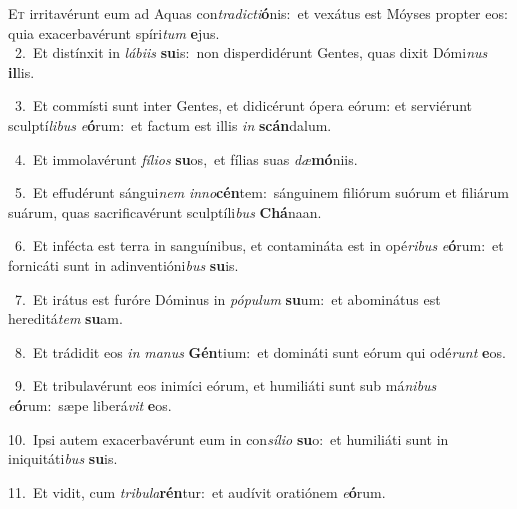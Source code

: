 \lettrine{\initial\textcolor{\initialcolor}{E}}{t} irritavérunt eum ad Aquas con\-\textit{tra}\-\textit{dic}\textit{ti}\textbf{ó}nis:~\star et vexátus est Móyses propter eos: quia exacerbavérunt spíri\textit{tum} \textbf{e}\-jus.\\
{\numbfont\textcolor{\numbcolor}{~2.}}~Et distínxit in \textit{lá}\-\textit{bi}\textit{is} \textbf{su}\-is:~\star non disperdidérunt Gentes, quas dixit Dómi\textit{nus} \textbf{il}\-lis.\par
{\numbfont\textcolor{\numbcolor}{~3.}}~Et commísti sunt inter Gentes, et didicérunt ópera eórum: et serviérunt sculptí\-\textit{li}\-\textit{bus} \textit{e}\-\textbf{ó}rum:~\star et factum est illis \textit{in} \textbf{scán}\-dalum.\par
{\numbfont\textcolor{\numbcolor}{~4.}}~Et immolavérunt \textit{fí}\-\textit{li}\textit{os} \textbf{su}\-os,~\star et fílias suas \textit{dæ}\-\textbf{mó}niis.\par
{\numbfont\textcolor{\numbcolor}{~5.}}~Et effudérunt sángui\textit{nem} \textit{in}\-\textit{no}\textbf{cén}tem:~\star sánguinem filiórum suórum et filiárum suárum, quas sacrificavérunt sculptíli\textit{bus} \textbf{Chá}\-naan.\par
{\numbfont\textcolor{\numbcolor}{~6.}}~Et infécta est terra in sanguínibus, et contamináta est in opé\-\textit{ri}\-\textit{bus} \textit{e}\-\textbf{ó}rum:~\star et fornicáti sunt in adinventióni\textit{bus} \textbf{su}\-is.\par
{\numbfont\textcolor{\numbcolor}{~7.}}~Et irátus est furóre Dóminus in \textit{pó}\-\textit{pu}\textit{lum} \textbf{su}\-um:~\star et abominátus est hereditá\textit{tem} \textbf{su}\-am.\par
{\numbfont\textcolor{\numbcolor}{~8.}}~Et trádidit eos \textit{in} \textit{ma}\-\textit{nus} \textbf{Gén}\-tium:~\star et domináti sunt eórum qui odé\textit{runt} \textbf{e}\-os.\par
{\numbfont\textcolor{\numbcolor}{~9.}}~Et tribulavérunt eos inimíci eórum, et humiliáti sunt sub má\-\textit{ni}\-\textit{bus} \textit{e}\-\textbf{ó}rum:~\star sæpe liberá\textit{vit} \textbf{e}\-os.\par
{\numbfont\textcolor{\numbcolor}{10.}}~Ipsi autem exacerbavérunt eum in con\-\textit{sí}\-\textit{li}\textit{o} \textbf{su}\-o:~\star et humiliáti sunt in iniquitáti\textit{bus} \textbf{su}\-is.\par
{\numbfont\textcolor{\numbcolor}{11.}}~Et vidit, cum \textit{tri}\-\textit{bu}\textit{la}\textbf{rén}tur:~\star et audívit oratiónem \textit{e}\-\textbf{ó}rum.\par
